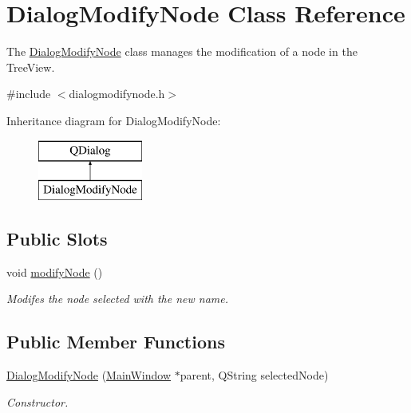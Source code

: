 \hypertarget{classDialogModifyNode}{\section{Dialog\-Modify\-Node Class Reference}
\label{classDialogModifyNode}
}


The \hyperlink{classDialogModifyNode}{Dialog\-Modify\-Node} class manages the modification of a node in the Tree\-View.  




{\ttfamily \#include $<$dialogmodifynode.\-h$>$}

Inheritance diagram for Dialog\-Modify\-Node\-:\begin{figure}[H]
\begin{center}
\leavevmode
\includegraphics[height=2.000000cm]{classDialogModifyNode}
\end{center}
\end{figure}
\subsection*{Public Slots}
\begin{DoxyCompactItemize}
\item 
\hypertarget{classDialogModifyNode_a93522938fb36db6cca68f92b8360a3ca}{void \hyperlink{classDialogModifyNode_a93522938fb36db6cca68f92b8360a3ca}{modify\-Node} ()}\label{classDialogModifyNode_a93522938fb36db6cca68f92b8360a3ca}

\begin{DoxyCompactList}\small\item\em Modifes the node selected with the new name. \end{DoxyCompactList}\end{DoxyCompactItemize}
\subsection*{Public Member Functions}
\begin{DoxyCompactItemize}
\item 
\hyperlink{classDialogModifyNode_acd9fdede53fb8c97f5fa7ad1984d743f}{Dialog\-Modify\-Node} (\hyperlink{classMainWindow}{Main\-Window} $\ast$parent, Q\-String selected\-Node)
\begin{DoxyCompactList}\small\item\em Constructor. \end{DoxyCompactList}\end{DoxyCompactItemize}

